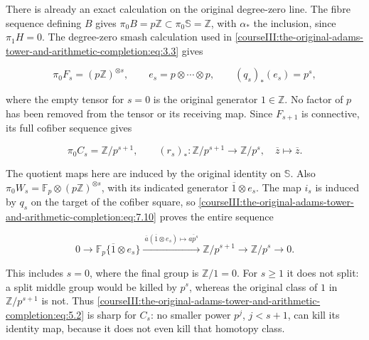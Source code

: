 There is already an exact calculation on the original degree-zero line. The fibre sequence defining \(B\) gives
\(\pi_0B=p\mathbb Z\subset\pi_0\mathbb S=\mathbb Z\), with \(\alpha_*\) the inclusion, since \(\pi_1H=0\). The degree-zero smash calculation used in \eqref{courseIII:the-original-adams-tower-and-arithmetic-completion:eq:3.3} gives

\begin{equation}
\pi_0F_s=(p\mathbb Z)^{\otimes s},\qquad
e_s=p\otimes\cdots\otimes p,\qquad
(q_s)_*(e_s)=p^s,
\label{courseIII:the-original-adams-tower-and-arithmetic-completion:eq:7.10}
\end{equation}

where the empty tensor for \(s=0\) is the original generator \(1\in\mathbb Z\). No factor of \(p\) has been removed from the tensor or its receiving map. Since \(F_{s+1}\) is connective, its full cofiber sequence gives

\begin{equation}
\pi_0C_s=\mathbb Z/p^{s+1},\qquad
(r_s)_*:\mathbb Z/p^{s+1}\longrightarrow\mathbb Z/p^s,
\quad\overline z\longmapsto\overline z.
\label{courseIII:the-original-adams-tower-and-arithmetic-completion:eq:7.11}
\end{equation}

The quotient maps here are induced by the original identity on \(\mathbb S\). Also
\(\pi_0W_s=\mathbb F_p\otimes(p\mathbb Z)^{\otimes s}\), with its indicated generator \(\overline1\otimes e_s\). The map \(i_s\) is induced by \(q_s\) on the target of the cofiber square, so \eqref{courseIII:the-original-adams-tower-and-arithmetic-completion:eq:7.10} proves the entire sequence

\begin{equation}
0\longrightarrow\mathbb F_p\{\overline1\otimes e_s\}
\xrightarrow{\ \overline a(\overline1\otimes e_s)\mapsto\overline{ap^s}\ }
\mathbb Z/p^{s+1}\longrightarrow\mathbb Z/p^s\longrightarrow0.
\label{courseIII:the-original-adams-tower-and-arithmetic-completion:eq:7.12}
\end{equation}

This includes \(s=0\), where the final group is \(\mathbb Z/1=0\). For \(s\geq1\) it does not split: a split middle group would be killed by \(p^s\), whereas the original class of \(1\) in \(\mathbb Z/p^{s+1}\) is not. Thus \eqref{courseIII:the-original-adams-tower-and-arithmetic-completion:eq:5.2} is sharp for \(C_s\): no smaller power \(p^j\), \(j<s+1\), can kill its identity map, because it does not even kill that homotopy class.

